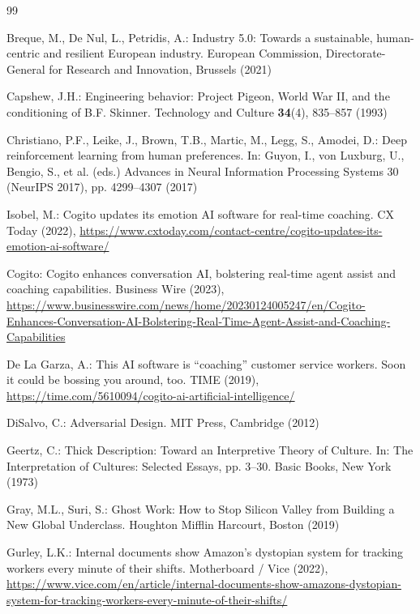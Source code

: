 \documentclass[runningheads]{llncs}
\begin{document}
\begin{thebibliography}{99}

Breque, M., De Nul, L., Petridis, A.: Industry 5.0: Towards a sustainable, human-centric and resilient European industry. European Commission, Directorate-General for Research and Innovation, Brussels (2021)

Capshew, J.H.: Engineering behavior: Project Pigeon, World War II, and the conditioning of B.F. Skinner. Technology and Culture \textbf{34}(4), 835--857 (1993)

Christiano, P.F., Leike, J., Brown, T.B., Martic, M., Legg, S., Amodei, D.: Deep reinforcement learning from human preferences. In: Guyon, I., von Luxburg, U., Bengio, S., et al. (eds.) Advances in Neural Information Processing Systems 30 (NeurIPS 2017), pp. 4299--4307 (2017)

Isobel, M.: Cogito updates its emotion AI software for real-time coaching. CX Today (2022), \url{https://www.cxtoday.com/contact-centre/cogito-updates-its-emotion-ai-software/}

Cogito: Cogito enhances conversation AI, bolstering real-time agent assist and coaching capabilities. Business Wire (2023), \url{https://www.businesswire.com/news/home/20230124005247/en/Cogito-Enhances-Conversation-AI-Bolstering-Real-Time-Agent-Assist-and-Coaching-Capabilities}

De La Garza, A.: This AI software is ``coaching'' customer service workers. Soon it could be bossing you around, too. TIME (2019), \url{https://time.com/5610094/cogito-ai-artificial-intelligence/}

DiSalvo, C.: Adversarial Design. MIT Press, Cambridge (2012)

Geertz, C.: Thick Description: Toward an Interpretive Theory of Culture. In: The Interpretation of Cultures: Selected Essays, pp. 3--30. Basic Books, New York (1973)

Gray, M.L., Suri, S.: Ghost Work: How to Stop Silicon Valley from Building a New Global Underclass. Houghton Mifflin Harcourt, Boston (2019)

Gurley, L.K.: Internal documents show Amazon's dystopian system for tracking workers every minute of their shifts. Motherboard / Vice (2022), \url{https://www.vice.com/en/article/internal-documents-show-amazons-dystopian-system-for-tracking-workers-every-minute-of-their-shifts/}


\end{thebibliography}
\end{document}
